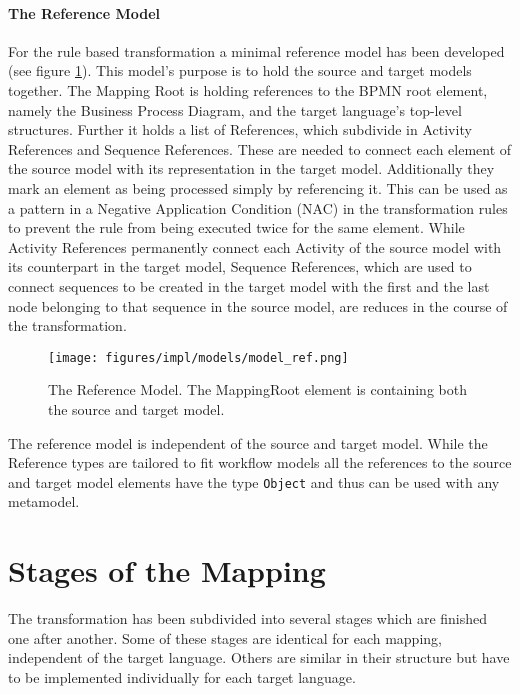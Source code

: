 \paragraph*{The Reference Model}

For the rule based transformation a minimal reference model has been developed (see figure \ref{fig:model_ref}). This model's purpose is to hold the source and target models together. The Mapping Root is holding references to the BPMN root element, namely the Business Process Diagram, and the target language's top-level structures. Further it holds a list of References, which subdivide in Activity References and Sequence References. These are needed to connect each element of the source model with its representation in the target model. Additionally they mark an element as being processed simply by referencing it. This can be used as a pattern in a Negative Application Condition (NAC) in the transformation rules to prevent the rule from being executed twice for the same element. While Activity References permanently connect each Activity of the source model with its counterpart in the target model, Sequence References, which are used to connect sequences to be created in the target model with the first and the last node belonging to that sequence in the source model, are reduces in the course of the transformation.

\begin{figure}[htp]
	\centering
	\texttt{[image: figures/impl/models/model\_ref.png]}
	\caption[The Reference Model]{The Reference Model. The MappingRoot element is containing both the source and target model.}
	\label{fig:model_ref}
\end{figure}

The reference model is independent of the source and target model. While the Reference types are tailored to fit workflow models all the references to the source and target model elements have the type \verb|Object| and thus can be used with any metamodel.



\section{Stages of the Mapping}

The transformation has been subdivided into several stages which are finished one after another. Some of these stages are identical for each mapping, independent of the target language. Others are similar in their structure but have to be implemented individually for each target language.

